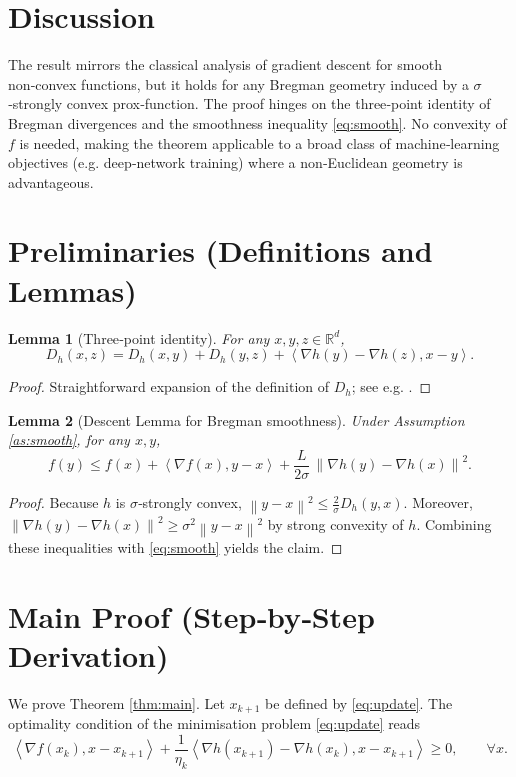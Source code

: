 \documentclass[11pt]{article}
\newtheorem{lemma}{Lemma}
\newcommand{\norm}[1]{\left\lVert#1\right\rVert}
\newcommand{\inner}[2]{\left\langle #1,#2\right\rangle}
\newcommand{\D}[2]{D_{h}(#1,#2)}
\begin{document}
\section*{Discussion}
The result mirrors the classical analysis of gradient descent for smooth non‑convex functions, but it holds for any Bregman geometry induced by a $\sigma$‑strongly convex prox‑function. The proof hinges on the three‑point identity of Bregman divergences and the smoothness inequality \eqref{eq:smooth}. No convexity of $f$ is needed, making the theorem applicable to a broad class of machine‑learning objectives (e.g. deep‑network training) where a non‑Euclidean geometry is advantageous.

\section*{Preliminaries (Definitions and Lemmas)}
\begin{lemma}[Three‑point identity]
\label{lem:three}
For any $x,y,z\in\mathbb{R}^{d}$,
\[
\D{x}{z}= \D{x}{y}+ \D{y}{z}+ \inner{\nabla h(y)-\nabla h(z)}{x-y}.
\]
\end{lemma}
\begin{proof}
Straightforward expansion of the definition of $D_{h}$; see e.g. \cite{Bauschke1997}.
\end{proof}

\begin{lemma}[Descent Lemma for Bregman smoothness]
\label{lem:descent}
Under Assumption \ref{as:smooth}, for any $x,y$,
\[
f(y)\le f(x)+\inner{\nabla f(x)}{y-x}+\frac{L}{2\sigma}\,\norm{\nabla h(y)-\nabla h(x)}^{2}.
\]
\end{lemma}
\begin{proof}
Because $h$ is $\sigma$‑strongly convex, $\norm{y-x}^{2}\le \frac{2}{\sigma}\D{y}{x}$. Moreover,
$\norm{\nabla h(y)-\nabla h(x)}^{2}\ge \sigma^{2}\norm{y-x}^{2}$ by strong convexity of $h$. Combining these inequalities with \eqref{eq:smooth} yields the claim.
\end{proof}

\section*{Main Proof (Step‑by‑Step Derivation)}
We prove Theorem \ref{thm:main}. Let $x_{k+1}$ be defined by \eqref{eq:update}. The optimality condition of the minimisation problem \eqref{eq:update} reads
\[
\inner{\nabla f(x_{k})}{x-x_{k+1}}+\frac{1}{\eta_{k}}\inner{\nabla h(x_{k+1})-\nabla h(x_{k})}{x-x_{k+1}}\ge 0,\qquad\forall x.
\tag{OPT}
\]
\end{document}
